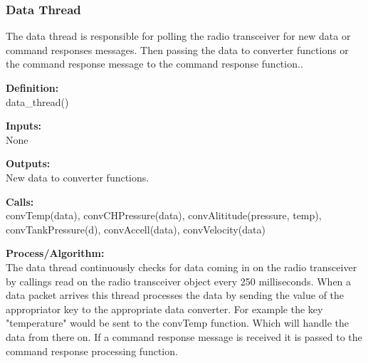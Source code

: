 \documentclass[10pt,draftclsnofoot,onecolumn,compsoc]{IEEEtran}
\begin{document}
\subsubsection{Data Thread}
The data thread is responsible for polling the radio transceiver for new data or command responses messages. Then passing the data to converter functions or the command response message to the command response function.. \par
{\bf Definition:} \\ 
data\_thread() \par
{\bf Inputs:} \\  None \par
{\bf Outputs:} \\ New data to converter functions. \par
{\bf Calls:} \\ convTemp(data), convCHPressure(data), convAlititude(pressure, temp), convTankPressure(d), convAccell(data), convVelocity(data) \par
{\bf Process/Algorithm:} \\
The data thread continuously checks for data coming in on the radio transceiver by callings read on the radio transceiver object every 250 milliseconds. When a data packet arrives this thread processes the data by sending the value of the appropriator key to the appropriate data converter. For example the key "temperature" would be sent to the convTemp function. Which will handle the data from there on. If a command response message is received it is passed to the command response processing function.  \par
\end{document}

